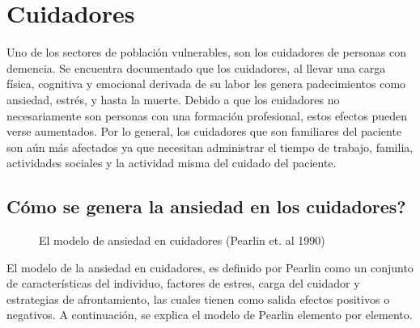 \section{Cuidadores}\label{secc:caregivers}
Uno de los sectores de poblaci\'on vulnerables, son los cuidadores de personas con demencia. Se encuentra documentado que los cuidadores, al llevar una carga f\'isica, cognitiva y emocional derivada de su labor les genera padecimientos como ansiedad, estr\'es, y hasta la muerte\citep{Chen2013}. Debido a que los cuidadores no necesariamente son personas con una formaci\'on profesional, estos efectos pueden verse aumentados. Por lo general, los cuidadores que son familiares del paciente son a\'un m\'as afectados ya que necesitan administrar el tiempo de trabajo, familia, actividades sociales y la actividad misma del cuidado del paciente.

\subsection{C\'omo se genera la ansiedad en los cuidadores?}\label{secc:caregiverburden}

\begin{figure}[h]
	\centering
	\caption{El modelo de ansiedad en cuidadores (Pearlin et. al 1990)} \label{fig:modeloAnsiedad}
\end{figure}
El modelo de la ansiedad en cuidadores, es definido por Pearlin como un conjunto de caracter\'isticas del individuo, factores de estres, carga del cuidador y estrategias de afrontamiento, las cuales tienen como salida efectos positivos o negativos. A continuaci\'on, se explica el modelo de Pearlin elemento por elemento.
